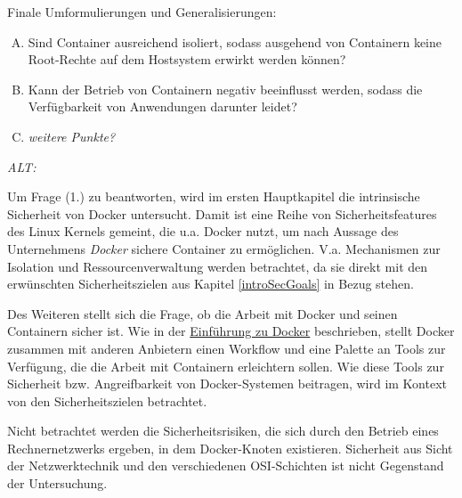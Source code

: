 \documentclass[../main.tex]{subfiles}
\begin{document}
  Finale Umformulierungen und Generalisierungen:

  \begin{enumerate}[(A)]
    \item Sind Container ausreichend isoliert, sodass ausgehend von Containern keine Root-Rechte auf dem Hostsystem erwirkt werden können?
    \item Kann der Betrieb von Containern negativ beeinflusst werden, sodass die Verfügbarkeit von Anwendungen darunter leidet?
    \item \emph{weitere Punkte?}
  \end{enumerate}



  \emph{ALT:}


  Um Frage (1.) zu beantworten, wird im ersten Hauptkapitel die intrinsische Sicherheit von Docker untersucht. Damit ist eine Reihe von Sicherheitsfeatures des Linux Kernels gemeint, die u.a. Docker nutzt, um nach Aussage des Unternehmens \emph{Docker} sichere Container zu ermöglichen. V.a. Mechanismen zur Isolation und Ressourcenverwaltung werden betrachtet, da sie direkt mit den erwünschten Sicherheitszielen aus Kapitel \ref{introSecGoals} in Bezug stehen.

  Des Weiteren stellt sich die Frage, ob die Arbeit mit Docker und seinen Containern sicher ist. Wie in der \hyperref[dockerIntro]{Einführung zu Docker} beschrieben, stellt Docker zusammen mit anderen Anbietern einen Workflow und eine Palette an Tools zur Verfügung, die die Arbeit mit Containern erleichtern sollen. Wie diese Tools zur Sicherheit bzw. Angreifbarkeit von Docker-Systemen beitragen, wird im Kontext von den Sicherheitszielen betrachtet.

  Nicht betrachtet werden die Sicherheitsrisiken, die sich durch den Betrieb eines Rechnernetzwerks ergeben, in dem Docker-Knoten existieren. Sicherheit aus Sicht der Netzwerktechnik und den verschiedenen \acrshort{OSI}-Schichten ist nicht Gegenstand der Untersuchung.


\end{document}
